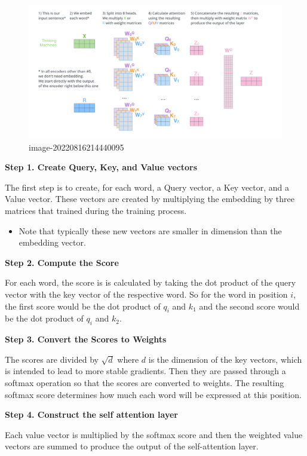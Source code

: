 \documentclass[
]{book}
\providecommand{\tightlist}{%
  \setlength{\itemsep}{0pt}\setlength{\parskip}{0pt}}
\begin{document}
\begin{figure}
\centering
\includegraphics{Figures/transformers_04.png}
\caption{image-20220816214440095}
\end{figure}

\textbf{Step 1. Create Query, Key, and Value vectors}

The first step is to create, for each word, a Query vector, a Key vector, and a Value vector. These vectors are created by multiplying the embedding by three matrices that trained during the training process.

\begin{itemize}
\tightlist
\item
  Note that typically these new vectors are smaller in dimension than the embedding vector.
\end{itemize}

\textbf{Step 2. Compute the Score}

For each word, the score is is calculated by taking the dot product of the query vector with the key vector of the respective word. So for the word in position \(i\), the first score would be the dot product of \(q_i\) and \(k_1\) and the second score would be the dot product of \(q_i\) and \(k_2\).

\textbf{Step 3. Convert the Scores to Weights}

The scores are divided by \(\sqrt{d}\) where \(d\) is the dimension of the key vectors, which is intended to lead to more stable gradients. Then they are passed through a softmax operation so that the scores are converted to weights. The resulting softmax score determines how much each word will be expressed at this position.

\textbf{Step 4. Construct the self attention layer}

Each value vector is multiplied by the softmax score and then the weighted value vectors are summed to produce the output of the self-attention layer.
\end{document}
